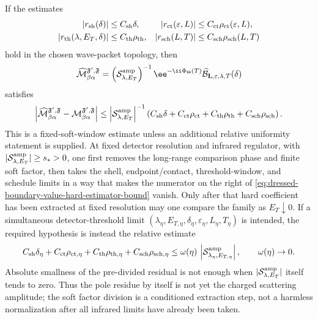 \begin{controlledapproximation}
If the estimates
\[
  \begin{aligned}
    |r_{\rm sh}(\delta)|
    &\le C_{\rm sh}\delta,
    &
    |r_{\rm ct}(\varepsilon,L)|
    &\le C_{\rm ct}\rho_{\rm ct}(\varepsilon,L),
    \\
    |r_{\rm th}(\lambda,E_T,\delta)|
    &\le C_{\rm th}\rho_{\rm th},
    &
    |r_{\rm sch}(L,T)|
    &\le C_{\rm sch}\rho_{\rm sch}(L,T)
  \end{aligned}
\]
hold in the chosen wave-packet topology, then
\begin{equation}
  \widehat{\mathcal M}_{\beta\alpha}^{\mathfrak F',\mathfrak F}
  =
  \left(\mathcal S_{\lambda,E_T}^{\rm amp}\right)^{-1}
  \ee^{-\ii\Phi_\Theta(T)}
  \widehat{\mathcal B}_{\mathbf L,\varepsilon,\lambda,T}(\delta)
  \label{eq:dressed-boundary-value-hard-estimator}
\end{equation}
satisfies
\begin{equation}
  \left|
    \widehat{\mathcal M}_{\beta\alpha}^{\mathfrak F',\mathfrak F}
    -
    \mathcal M_{\beta\alpha}^{\mathfrak F',\mathfrak F}
  \right|
  \le
  \left|\mathcal S_{\lambda,E_T}^{\rm amp}\right|^{-1}
  \left(
    C_{\rm sh}\delta
    +
    C_{\rm ct}\rho_{\rm ct}
    +
    C_{\rm th}\rho_{\rm th}
    +
    C_{\rm sch}\rho_{\rm sch}
  \right).
  \label{eq:dressed-boundary-value-hard-estimator-bound}
\end{equation}
This is a fixed-soft-window estimate unless an additional relative
uniformity statement is supplied.  At fixed detector resolution and infrared
regulator, with
\(|\mathcal S_{\lambda,E_T}^{\rm amp}|\ge s_*>0\), one first removes the
long-range comparison phase and finite soft factor, then takes the shell,
endpoint/contact, threshold-window, and schedule limits in a way that makes
the numerator on the right of
\eqref{eq:dressed-boundary-value-hard-estimator-bound} vanish.  Only after
that hard coefficient has been extracted at fixed resolution may one compare
the family as \(E_T\downarrow0\).  If a simultaneous detector-threshold limit
\((\lambda_\eta,E_{T,\eta},\delta_\eta,\varepsilon_\eta,L_\eta,T_\eta)\) is
intended, the required hypothesis is instead the relative estimate
\[
  C_{\rm sh}\delta_\eta
  +C_{\rm ct}\rho_{\rm ct,\eta}
  +C_{\rm th}\rho_{\rm th,\eta}
  +C_{\rm sch}\rho_{\rm sch,\eta}
  \le
  \omega(\eta)\,
  \left|\mathcal S_{\lambda_\eta,E_{T,\eta}}^{\rm amp}\right|,
  \qquad \omega(\eta)\to0.
\]
Absolute smallness of the pre-divided residual is not enough when
\(|\mathcal S_{\lambda,E_T}^{\rm amp}|\) itself tends to zero.  Thus the pole
residue by itself is not yet the charged scattering amplitude; the soft
factor division is a conditioned extraction step, not a harmless
normalization after all infrared limits have already been taken.


\end{controlledapproximation}
